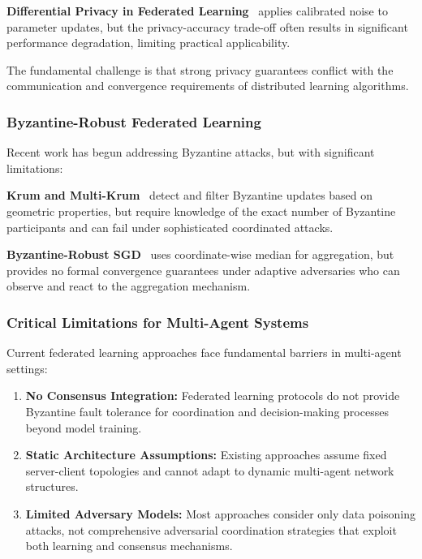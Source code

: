 \documentclass[conference]{IEEEtran}
\begin{document}
\textbf{Differential Privacy in Federated Learning}~\cite{dwork2006calibrating,abadi2016deep} applies calibrated noise to parameter updates, but the privacy-accuracy trade-off often results in significant performance degradation, limiting practical applicability.

The fundamental challenge is that strong privacy guarantees conflict with the communication and convergence requirements of distributed learning algorithms.

\subsubsection{Byzantine-Robust Federated Learning}

Recent work has begun addressing Byzantine attacks, but with significant limitations:

\textbf{Krum and Multi-Krum}~\cite{blanchard2017machine} detect and filter Byzantine updates based on geometric properties, but require knowledge of the exact number of Byzantine participants and can fail under sophisticated coordinated attacks.

\textbf{Byzantine-Robust SGD}~\cite{chen2017distributed} uses coordinate-wise median for aggregation, but provides no formal convergence guarantees under adaptive adversaries who can observe and react to the aggregation mechanism.

\subsubsection{Critical Limitations for Multi-Agent Systems}

Current federated learning approaches face fundamental barriers in multi-agent settings:

\begin{enumerate}
    \item \textbf{No Consensus Integration:} Federated learning protocols do not provide Byzantine fault tolerance for coordination and decision-making processes beyond model training.
    
    \item \textbf{Static Architecture Assumptions:} Existing approaches assume fixed server-client topologies and cannot adapt to dynamic multi-agent network structures.
    
    \item \textbf{Limited Adversary Models:} Most approaches consider only data poisoning attacks, not comprehensive adversarial coordination strategies that exploit both learning and consensus mechanisms.
\end{enumerate}
\end{document}
